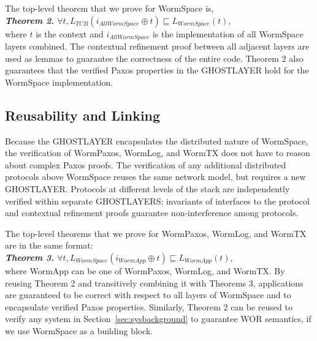 	The top-level theorem that we prove for WormSpace is, \\
\textit{\textbf{Theorem 2.} $\forall t, L_{TCB} (i_{AllWormSpace} \oplus t) \sqsubseteq L_{WormSpace} (t)$}, \\
where $t$ is the context and $i_{AllWormSpace}$ is the implementation of all WormSpace layers combined. The contextual refinement proof between all adjacent layers are used as lemmas to guarantee the correctness of the entire code. Theorem 2 also guarantees that the verified Paxos properties in the GHOSTLAYER hold for the WormSpace implementation.



\subsection{Reusability and Linking}
\label{subsec:proof_effort}

Because the GHOSTLAYER encapsulates the distributed nature of WormSpace, the verification of WormPaxos, WormLog, and WormTX does not have to reason about complex Paxos proofs. %
The verification of any additional distributed protocols above WormSpace reuses the same network model, but requires a new GHOSTLAYER. Protocols at different levels of the stack are independently verified within separate GHOSTLAYERS; invariants of interfaces to the protocol and contextual refinement proofs guarantee non-interference among protocols. 

The top-level theorems that we prove for WormPaxos, WormLog, and WormTX are in the same format:\\
\textit{\textbf{Theorem 3.} $\forall t, L_{WormSpace} (i_{WormApp} \oplus t) \sqsubseteq L_{WormApp} (t)$},\\
where WormApp can be one of WormPaxos, WormLog, and WormTX.
By reusing Theorem 2 and transitively combining it with Theorems 3, applications are guaranteed to be correct with respect to all layers of WormSpace and to encapsulate verified Paxos properties. Similarly, Theorem 2 can be reused to verify any system in Section~\ref{sec:sysbackground} to guarantee WOR semantics, if we use WormSpace as a building block. 


